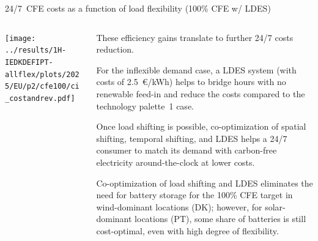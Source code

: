 \begin{frame}{24/7~CFE costs as a function of load flexibility (100\% CFE w/ LDES)}
\label{247costs-p2}

  {\footnotesize
  \vspace{0.2cm}
  
  \begin{columns}[T]

  \begin{column}{9cm}
  \centering
  \texttt{[image: ../results/1H-IEDKDEFIPT-allflex/plots/2025/EU/p2/cfe100/ci\_costandrev.pdf]}
  \end{column}

  \begin{column}{6cm}
  These efficiency gains translate to further 24/7 costs reduction.
  
  \vspace{0.1cm} 
  For the inflexible demand case, a LDES system (with costs of 2.5~€/kWh) helps to bridge hours with no renewable feed-in and reduce the costs compared to the technology palette~1 case. 

  \vspace{0.1cm} 
  Once load shifting is possible, co-optimization of spatial shifting, temporal shifting, and LDES helps a 24/7 consumer to match its demand with carbon-free electricity around-the-clock at lower costs.

  \vspace{0.1cm} 
  Co-optimization of load shifting and LDES eliminates the need for battery storage for the 100\% CFE target in wind-dominant locations (DK); however, for solar-dominant locations (PT), some share of batteries is still cost-optimal, even with high degree of flexibility.

  \end{column}
  \end{columns}
  }
\end{frame}




